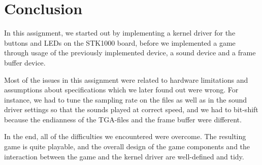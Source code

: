 \section{Conclusion}

In this assignment, we started out by implementing a kernel driver for
the buttons and LEDs on the STK1000 board, before we implemented a game
through usage of the previously implemented device, a sound device and a
frame buffer device.

Most of the issues in this assignment were related to hardware
limitations and assumptions about specifications which we later found
out were wrong. For instance, we had to tune the sampling rate on the
files as well as in the sound driver settings so that the sounds played
at correct speed, and we had to bit-shift because the endianness of the
TGA-files and the frame buffer were different.

In the end, all of the difficulties we encountered were overcome. The
resulting game is quite playable, and the overall design of the game
components and the interaction between the game and the kernel driver
are well-defined and tidy.
